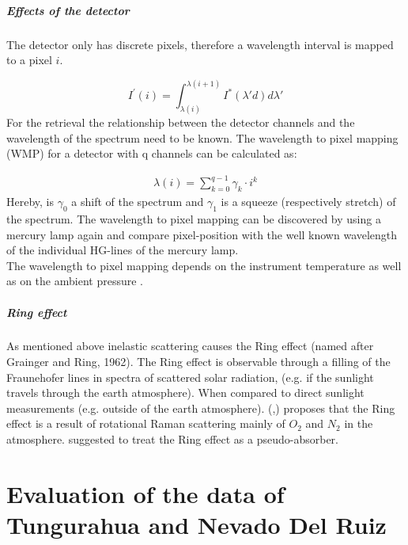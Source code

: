 \documentclass  [
  paper    = a4,
  BCOR     = 10mm,
  twoside,
  fontsize = 12pt,
  fleqn,
  toc      = bibnumbered,
  toc      = listofnumbered,
  numbers  = noendperiod,
  headings = normal,
  listof   = leveldown,
  version  = 3.03
]                                       {scrreprt}
\begin{document}
	\subsubsection*{Effects of the detector}
	The detector only has discrete pixels, therefore a wavelength interval is mapped to a pixel $i$.
	
	\begin{equation}
	I^{'}\left(i\right) = \int_{\lambda(i)}^{\lambda(i+1)}I^{*}\left(\lambda{'}d\right)d\lambda{'}
	\end{equation}
	For the retrieval the relationship between the detector channels and the wavelength of the spectrum need to be known.
	The wavelength to pixel mapping (WMP) for a detector with q channels can be calculated as:

	\begin{eqnarray}
	\lambda(i) = \sum_{k=0}^{q-1}\gamma_{k}\cdot i^{k}
	\end{eqnarray}
	Hereby, is $\gamma_{0}$ a shift of the spectrum and $\gamma_{1}$ is a squeeze (respectively stretch) of the spectrum.
	The wavelength to pixel mapping can be discovered by using a mercury lamp again and compare pixel-position with the well known wavelength of the individual HG-lines of the mercury lamp.\\
	The wavelength to pixel mapping depends on the instrument temperature as well as on the ambient pressure \citep{lubcke2014bro}.
	\subsubsection*{Ring effect}
	As mentioned above inelastic scattering causes the Ring effect (named after Grainger and Ring, 1962).
	The Ring effect is observable through a filling of the Fraunehofer lines in spectra of scattered solar radiation, (e.g. if the sunlight travels through the earth atmosphere). When compared to direct sunlight measurements (e.g. outside of the earth atmosphere).
	(\cite{bussemer1993ring},\cite{solomon1987interpretation}) proposes that the Ring effect is a result of  rotational Raman scattering mainly of
	$O_2$ and $N_2$ in the atmosphere.
	\cite{solomon1987interpretation} suggested to treat the Ring effect as a pseudo-absorber. 


	
	\part{Evaluation of the data of Tungurahua and Nevado Del Ruiz}
	
\end{document}
